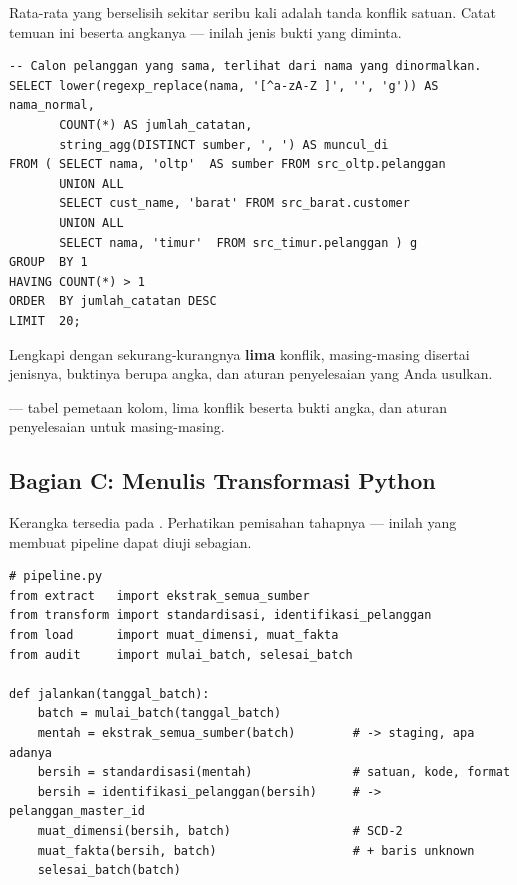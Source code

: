 Rata-rata yang berselisih sekitar seribu kali adalah tanda konflik satuan.
Catat temuan ini beserta angkanya --- inilah jenis bukti yang diminta.


\begin{lstlisting}[style=sqlgaya]
-- Calon pelanggan yang sama, terlihat dari nama yang dinormalkan.
SELECT lower(regexp_replace(nama, '[^a-zA-Z ]', '', 'g')) AS nama_normal,
       COUNT(*) AS jumlah_catatan,
       string_agg(DISTINCT sumber, ', ') AS muncul_di
FROM ( SELECT nama, 'oltp'  AS sumber FROM src_oltp.pelanggan
       UNION ALL
       SELECT cust_name, 'barat' FROM src_barat.customer
       UNION ALL
       SELECT nama, 'timur'  FROM src_timur.pelanggan ) g
GROUP  BY 1
HAVING COUNT(*) > 1
ORDER  BY jumlah_catatan DESC
LIMIT  20;
\end{lstlisting}

Lengkapi  dengan sekurang-kurangnya \textbf{lima}
konflik, masing-masing disertai jenisnya, buktinya berupa angka, dan aturan
penyelesaian yang Anda usulkan.

\begin{luaran}
 --- tabel pemetaan kolom, lima konflik
beserta bukti angka, dan aturan penyelesaian untuk masing-masing.
\end{luaran}

\subsection{Bagian C: Menulis Transformasi Python}


Kerangka tersedia pada . Perhatikan pemisahan tahapnya ---
inilah yang membuat pipeline dapat diuji sebagian.

\begin{lstlisting}[style=pythongaya]
# pipeline.py
from extract   import ekstrak_semua_sumber
from transform import standardisasi, identifikasi_pelanggan
from load      import muat_dimensi, muat_fakta
from audit     import mulai_batch, selesai_batch

def jalankan(tanggal_batch):
    batch = mulai_batch(tanggal_batch)
    mentah = ekstrak_semua_sumber(batch)        # -> staging, apa adanya
    bersih = standardisasi(mentah)              # satuan, kode, format
    bersih = identifikasi_pelanggan(bersih)     # -> pelanggan_master_id
    muat_dimensi(bersih, batch)                 # SCD-2
    muat_fakta(bersih, batch)                   # + baris unknown
    selesai_batch(batch)
\end{lstlisting}

